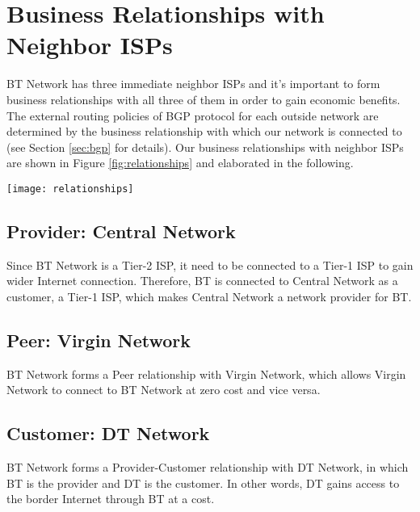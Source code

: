 \section{Business Relationships with Neighbor ISPs}
\label{sec:relationships}

BT Network has three immediate neighbor ISPs and it's important to form business relationships with all three of them in order to gain economic benefits. 
The external routing policies of BGP protocol for each outside network are determined by the business relationship with which our network is connected to (see Section \ref{sec:bgp} for details).
Our business relationships with neighbor ISPs are shown in Figure \ref{fig:relationships} and elaborated in the following.

\begin{figure*}[t!]
    \centering
    \texttt{[image: relationships]}
    \caption{Business Relationships of BT Network with Neighbor ISPs.}
    \label{fig:relationships}
\end{figure*}


\subsection{Provider: Central Network}
Since BT Network is a Tier-2 ISP, it need to be connected to a Tier-1 ISP to gain wider Internet connection. Therefore, BT is connected to Central Network as a customer, a Tier-1 ISP, which makes Central Network a network provider for BT.

\subsection{Peer: Virgin Network}
BT Network forms a Peer relationship with Virgin Network, which allows Virgin Network to connect to BT Network at zero cost and vice versa.

\subsection{Customer: DT Network}
\label{sec:dt}
BT Network forms a Provider-Customer relationship with DT Network, in which BT is the provider and DT is the customer. In other words, DT gains access to the border Internet through BT at a cost.
